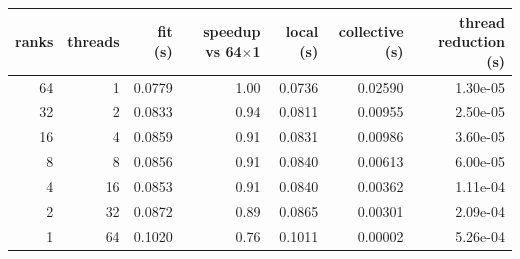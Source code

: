 \begin{tabular}{rrrrrrr}
\toprule
ranks & threads & fit (s) & speedup vs 64$\times$1 & local (s) & collective (s) & thread reduction (s)\\
\midrule
64 & 1 & 0.0779 & 1.00 & 0.0736 & 0.02590 & 1.30e-05\\
32 & 2 & 0.0833 & 0.94 & 0.0811 & 0.00955 & 2.50e-05\\
16 & 4 & 0.0859 & 0.91 & 0.0831 & 0.00986 & 3.60e-05\\
8 & 8 & 0.0856 & 0.91 & 0.0840 & 0.00613 & 6.00e-05\\
4 & 16 & 0.0853 & 0.91 & 0.0840 & 0.00362 & 1.11e-04\\
2 & 32 & 0.0872 & 0.89 & 0.0865 & 0.00301 & 2.09e-04\\
1 & 64 & 0.1020 & 0.76 & 0.1011 & 0.00002 & 5.26e-04\\
\bottomrule
\end{tabular}
